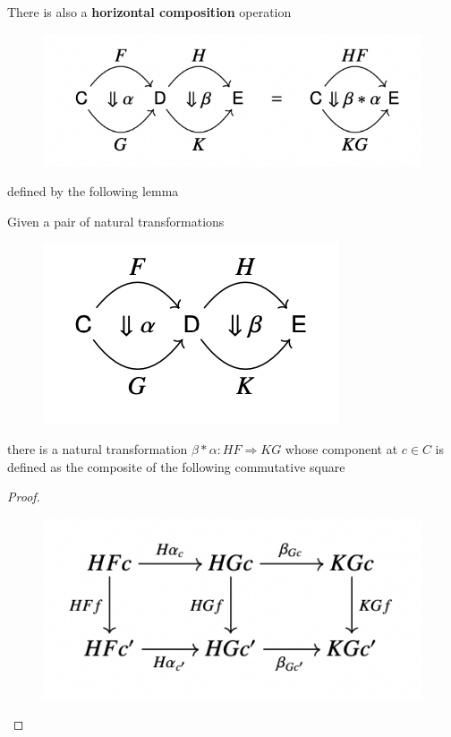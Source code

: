 \documentclass[11pt]{article}
\begin{document}
There is also a \textbf{horizontal composition} operation
\begin{figure}[htbp]
\centering
\includegraphics[width=.5\textwidth]{../images/CategoryTheoryInContext/2.png}
\label{}
\end{figure}
defined by the following lemma

\begin{lemma}
\label{1.7.4}
Given a pair of natural transformations
\begin{figure}[htbp]
\centering
\includegraphics[width=.4\textwidth]{../images/CategoryTheoryInContext/3.png}
\label{}
\end{figure}
there is a natural transformation \(\beta*\alpha:HF\Rightarrow KG\) whose component at \(c\in C\) is defined as the
composite of the following commutative square
\begin{center}\end{center}
\end{lemma}

\begin{proof}
\begin{figure}[htbp]
\centering
\includegraphics[width=.5\textwidth]{../images/CategoryTheoryInContext/4.png}
\label{}
\end{figure}
\end{proof}
\end{document}
